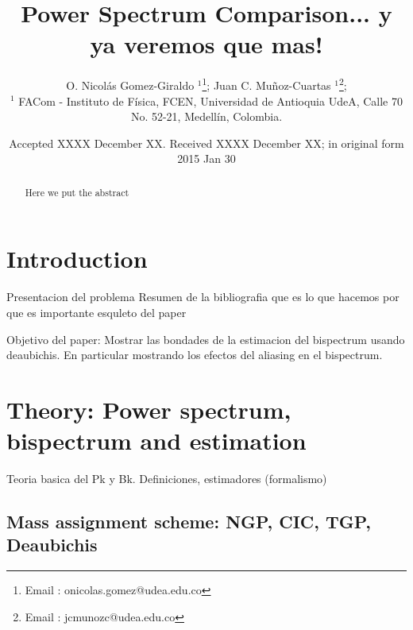 \documentclass[useAMS,usenatbib]{mn2e}
\title[Power Spectrum Comparison...]
{Power Spectrum Comparison... y ya veremos que mas!}
\author[O. Nicol\'as Gomez-Giraldo, Juan C. Mu\~noz-Cuartas {\bf el orden habra de cambiar, el primer autor se lo merece}]
       {O. Nicol\'as Gomez-Giraldo $^{1}$\thanks{Email : onicolas.gomez@udea.edu.co};
         Juan C. Mu\~noz-Cuartas $^{1}$\thanks{Email : jcmunozc@udea.edu.co};\\ $^{1}$ FACom
         - Instituto de F\'isica, FCEN, Universidad de Antioquia UdeA, Calle
         70 No. 52-21, Medell\'in, Colombia.\\ 
         }
\begin{document}
\date{Accepted XXXX December XX. Received XXXX December XX; in original form
  2015 Jan 30}

\pagerange{\pageref{firstpage}--\pageref{lastpage}} 

\maketitle

\label{firstpage}

\begin{abstract}

Here we put the abstract

\end{abstract}

\begin{keywords}

\end{keywords}


\section{Introduction}

Presentacion del problema
Resumen de la bibliografia
que es lo que hacemos
por que es importante
esquleto del paper

Objetivo del paper: Mostrar las bondades de la estimacion del
bispectrum usando deaubichis. En particular mostrando los efectos del
aliasing en el bispectrum.




\section{Theory: Power spectrum, bispectrum and estimation} 
\label{sec:theory}

Teoria basica del Pk y Bk. Definiciones, estimadores (formalismo)

\subsection{Mass assignment scheme: NGP, CIC, TGP, Deaubichis}
\label{sec:theory:MAS}
\end{document}

